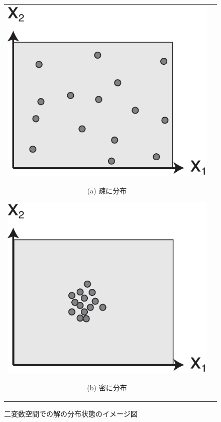 \documentclass[../main/main]{subfiles}
\begin{document}
\begin{figure}[htbp]
\begin{tabular}{cc}
\begin{minipage}{0.49\hsize}
\includegraphics[width=0.9\linewidth]{../figures/sparse_distribution.eps}
\begin{center}
{\footnotesize (a) 疎に分布}
\end{center}
\end{minipage}
\begin{minipage}{0.49\hsize}
\includegraphics[width=0.9\linewidth]{../figures/dense_distribution.eps}
\begin{center}
{\footnotesize (b) 密に分布}
\end{center}
\end{minipage}
\end{tabular}
\caption{二変数空間での解の分布状態のイメージ図}
\label{concept_image}
\end{figure}
\end{document}
